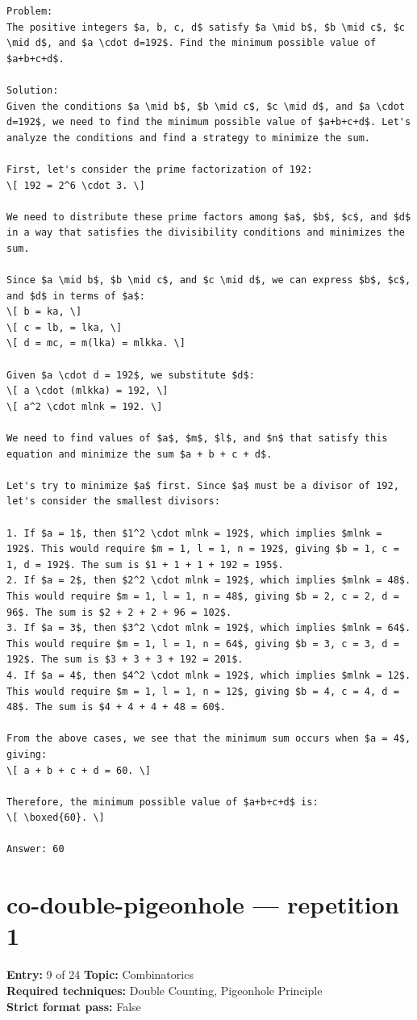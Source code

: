 \documentclass[11pt]{article}
\begin{document}
\begin{lstlisting}[style=modeloutput]
Problem:
The positive integers $a, b, c, d$ satisfy $a \mid b$, $b \mid c$, $c \mid d$, and $a \cdot d=192$. Find the minimum possible value of $a+b+c+d$.

Solution:
Given the conditions $a \mid b$, $b \mid c$, $c \mid d$, and $a \cdot d=192$, we need to find the minimum possible value of $a+b+c+d$. Let's analyze the conditions and find a strategy to minimize the sum.

First, let's consider the prime factorization of 192:
\[ 192 = 2^6 \cdot 3. \]

We need to distribute these prime factors among $a$, $b$, $c$, and $d$ in a way that satisfies the divisibility conditions and minimizes the sum.

Since $a \mid b$, $b \mid c$, and $c \mid d$, we can express $b$, $c$, and $d$ in terms of $a$:
\[ b = ka, \]
\[ c = lb, = lka, \]
\[ d = mc, = m(lka) = mlkka. \]

Given $a \cdot d = 192$, we substitute $d$:
\[ a \cdot (mlkka) = 192, \]
\[ a^2 \cdot mlnk = 192. \]

We need to find values of $a$, $m$, $l$, and $n$ that satisfy this equation and minimize the sum $a + b + c + d$.

Let's try to minimize $a$ first. Since $a$ must be a divisor of 192, let's consider the smallest divisors:

1. If $a = 1$, then $1^2 \cdot mlnk = 192$, which implies $mlnk = 192$. This would require $m = 1, l = 1, n = 192$, giving $b = 1, c = 1, d = 192$. The sum is $1 + 1 + 1 + 192 = 195$.
2. If $a = 2$, then $2^2 \cdot mlnk = 192$, which implies $mlnk = 48$. This would require $m = 1, l = 1, n = 48$, giving $b = 2, c = 2, d = 96$. The sum is $2 + 2 + 2 + 96 = 102$.
3. If $a = 3$, then $3^2 \cdot mlnk = 192$, which implies $mlnk = 64$. This would require $m = 1, l = 1, n = 64$, giving $b = 3, c = 3, d = 192$. The sum is $3 + 3 + 3 + 192 = 201$.
4. If $a = 4$, then $4^2 \cdot mlnk = 192$, which implies $mlnk = 12$. This would require $m = 1, l = 1, n = 12$, giving $b = 4, c = 4, d = 48$. The sum is $4 + 4 + 4 + 48 = 60$.

From the above cases, we see that the minimum sum occurs when $a = 4$, giving:
\[ a + b + c + d = 60. \]

Therefore, the minimum possible value of $a+b+c+d$ is:
\[ \boxed{60}. \]

Answer: 60
\end{lstlisting}
\clearpage
\section{co-double-pigeonhole --- repetition 1}
\begin{minipage}{\textwidth}
\color{metadata}\small\raggedright
\textbf{Entry:} 9 of 24\quad
\textbf{Topic:} Combinatorics\\[2pt]
\textbf{Required techniques:} Double Counting, Pigeonhole Principle\\[2pt]
\textbf{Strict format pass:} False
\end{minipage}
\end{document}
